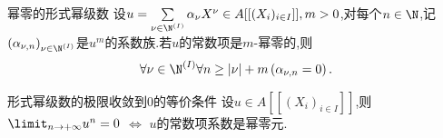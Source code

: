 \begin{proposition}{幂零的形式幂级数}{}
	设$u=\sum\limits_{\nu\in\N^{\left(I\right)}}\alpha_{\nu}X^{\nu}\in A[[(X_{i})_{i\in I}]],m>0$,对每个$n\in\N$,记$\left(\alpha_{\nu,n}\right)_{\nu\in\N^{\left(I\right)}}$是$u^{m}$的系数族.若$u$的常数项是$m$-幂零的,则
	\begin{align*}
		\forall\nu\in\N^{\left(I\right)}\forall n\geq\left|\nu\right|+m\left(\alpha_{\nu,n}=0\right).
	\end{align*}
\end{proposition}

\begin{corollary}{形式幂级数的极限收敛到$0$的等价条件}{}
	设$u\in A[[(X_{i})_{i\in I}]]$,则$\limit_{n\to+\infty}u^{n}=0$ $\iff$ $u$的常数项系数是幂零元.
\end{corollary}















































































































